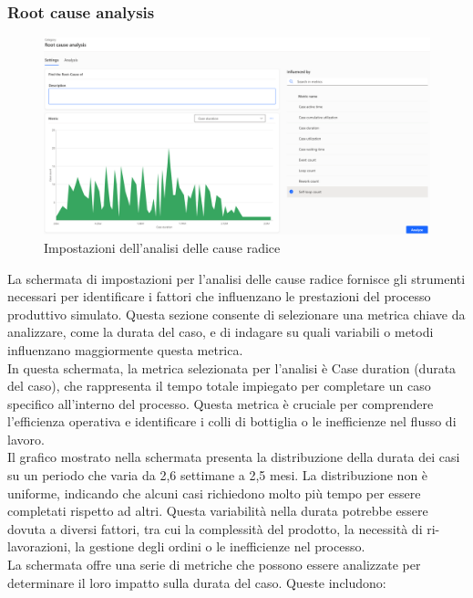 \documentclass{article}
\begin{document}
\subsubsection{Root cause analysis}
\begin{figure}[H]
    \centering
    \includegraphics[width=\textwidth]{imgMicrosoft/TerzaSimulazione/RootCauseAnalysisSettingsSimulazione3.png}
    \caption{Impostazioni dell'analisi delle cause radice}
    \label{fig:root-cause-analysis-settings}
\end{figure}
La schermata di impostazioni per l'analisi delle cause radice fornisce gli strumenti necessari per identificare i fattori che influenzano le prestazioni del processo produttivo simulato. Questa sezione consente di selezionare una metrica chiave da analizzare, come la durata del caso, e di indagare su quali variabili o metodi influenzano maggiormente questa metrica.\\
In questa schermata, la metrica selezionata per l'analisi è Case duration (durata del caso), che rappresenta il tempo totale impiegato per completare un caso specifico all'interno del processo. Questa metrica è cruciale per comprendere l'efficienza operativa e identificare i colli di bottiglia o le inefficienze nel flusso di lavoro.\\
Il grafico mostrato nella schermata presenta la distribuzione della durata dei casi su un periodo che varia da 2,6 settimane a 2,5 mesi. La distribuzione non è uniforme, indicando che alcuni casi richiedono molto più tempo per essere completati rispetto ad altri. Questa variabilità nella durata potrebbe essere dovuta a diversi fattori, tra cui la complessità del prodotto, la necessità di ri-lavorazioni, la gestione degli ordini o le inefficienze nel processo.\\
La schermata offre una serie di metriche che possono essere analizzate per determinare il loro impatto sulla durata del caso. Queste includono:
\end{document}
